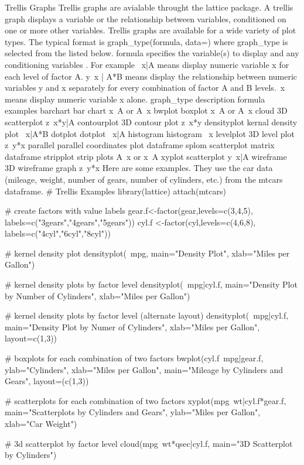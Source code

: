 
Trellis Graphs
Trellis graphs are avialable throught the lattice package. A trellis graph displays a variable or the relationship between variables, conditioned on one or more other variables. Trellis graphs are available for a wide variety of plot types.
The typical format is
graph_type(formula, data=)
where graph_type is selected from the listed below. formula specifies the variable(s) to display and any conditioning variables . For example ~x|A means display numeric variable x for each level of factor A. y~x | A*B means display the relationship between numeric variables y and x separately for every combination of factor A and B levels.~x means display numeric variable x alone.
graph_type
description
formula examples
barchart
bar chart
x~A or A~x
bwplot
boxplot
x~A or A~x
cloud
3D scatterplot
z~x*y|A
contourplot
3D contour plot
z~x*y
densityplot
kernal density plot
~x|A*B
dotplot
dotplot
~x|A
histogram
histogram
~x
levelplot
3D level plot
z~y*x
parallel
parallel coordinates plot
dataframe
splom
scatterplot matrix
dataframe
stripplot
strip plots
A~x or x~A
xyplot
scatterplot
y~x|A
wireframe
3D wireframe graph
z~y*x
Here are some examples. They use the car data (mileage, weight, number of gears, number of cylinders, etc.) from the mtcars dataframe.
# Trellis Examples 
library(lattice) 
attach(mtcars)

# create factors with value labels 
gear.f<-factor(gear,levels=c(3,4,5),
labels=c("3gears","4gears","5gears")) 
cyl.f <-factor(cyl,levels=c(4,6,8),
labels=c("4cyl","6cyl","8cyl")) 

# kernel density plot 
densityplot(~mpg, 
main="Density Plot", 
xlab="Miles per Gallon")

# kernel density plots by factor level 
densityplot(~mpg|cyl.f, 
main="Density Plot by Number of Cylinders",
xlab="Miles per Gallon")

# kernel density plots by factor level (alternate layout) 
densityplot(~mpg|cyl.f, 
main="Density Plot by Numer of Cylinders",
xlab="Miles per Gallon", 
layout=c(1,3))

# boxplots for each combination of two factors 
bwplot(cyl.f~mpg|gear.f,
ylab="Cylinders", xlab="Miles per Gallon", 
main="Mileage by Cylinders and Gears", 
layout=(c(1,3))

# scatterplots for each combination of two factors 
xyplot(mpg~wt|cyl.f*gear.f, 
main="Scatterplots by Cylinders and Gears", 
ylab="Miles per Gallon", xlab="Car Weight")

# 3d scatterplot by factor level 
cloud(mpg~wt*qsec|cyl.f, 
main="3D Scatterplot by Cylinders") 

